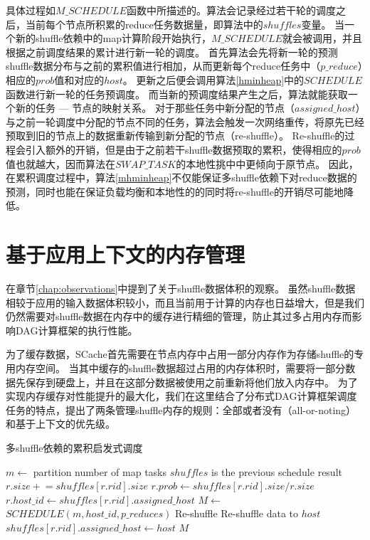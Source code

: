 具体过程如$M\_SCHEDULE$函数中所描述的。算法会记录经过若干轮的调度之后，当前每个节点所积累的reduce任务数据量，即算法中的$shuffles$变量。
当一个新的shuffle依赖中的map计算阶段开始执行，$M\_SCHEDULE$就会被调用，并且根据之前调度结果的累计进行新一轮的调度。
首先算法会先将新一轮的预测shuffle数据分布与之前的累积值进行相加，从而更新每个reduce任务中（$p\_reduce$）相应的$prob$值和对应的$host$。
更新之后便会调用算法\ref{hminheap}中的$SCHEDULE$函数进行新一轮的任务预调度。
而当新的预调度结果产生之后，算法就能获取一个新的任务 --- 节点的映射关系。
对于那些任务中新分配的节点（$assigned\_host$）与之前一轮调度中分配的节点不同的任务，算法会触发一次网络重传，将原先已经预取到旧的节点上的数据重新传输到新分配的节点（re-shuffle）。
Re-shuffle的过程会引入额外的开销，但是由于之前若干shuffle数据预取的累积，使得相应的$prob$值也就越大，因而算法在$SWAP\_TASK$的本地性挑中中更倾向于原节点。
因此，在累积调度过程中，算法\ref{mhminheap}不仅能保证多shuffle依赖下对reduce数据的预测，同时也能在保证负载均衡和本地性的的同时将re-shuffle的开销尽可能地降低。

\section{基于应用上下文的内存管理}

在章节\ref{chap:observations}中提到了关于shuffle数据体积的观察。
虽然shuffle数据相较于应用的输入数据体积较小，而且当前用于计算的内存也日益增大，但是我们仍然需要对shuffle数据在内存中的缓存进行精细的管理，防止其过多占用内存而影响DAG计算框架的执行性能。

为了缓存数据，SCache首先需要在节点内存中占用一部分内存作为存储shuffle的专用内存空间。
当其中缓存的shuffle数据超过占用的内存体积时，需要将一部分数据先保存到硬盘上，并且在这部分数据被使用之前重新将他们放入内存中。
为了实现内存缓存对性能提升的最大化，我们在这里结合了分布式DAG计算框架调度任务的特点，提出了两条管理shuffle内存的规则：全部或者没有（all-or-noting）和基于上下文的优先级。

\begin{algorithm}[H]
	\caption{多shuffle依赖的累积启发式调度}
	\label{mhminheap}
	\begin{algorithmic}[1]
		\small
			\State $m\gets$ partition number of map tasks
			\Comment $shuffles$ is the previous schedule result
				\State $r.size \mathrel{+}= shuffles\left[r.rid\right].size$
					\State $r.prob\gets shuffles\left[r.rid\right].size / r.size$
					\State $r.host\_id\gets shuffles\left[r.rid\right].assigned\_host$
				\EndIf
			\EndFor
			\State $M\gets$ $SCHEDULE\left(m, host\_id, p\_reduces\right)$
				\Comment Re-shuffle
					\State Re-shuffle data to $host$
					\State $shuffles\left[r.rid\right].assigned\_host\gets host$
					\EndIf
				\EndFor
			\EndFor
			\Return $M$
		\EndProcedure
	\end{algorithmic}
\end{algorithm}

